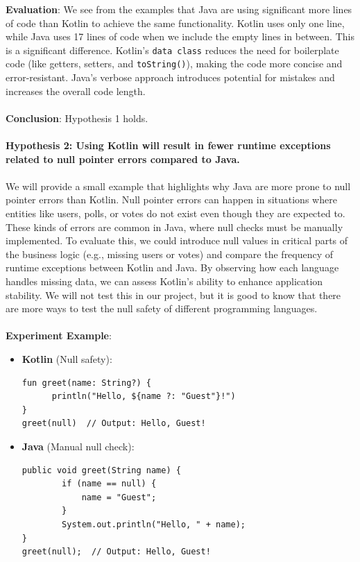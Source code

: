 \noindent \textbf{Evaluation}: We see from the examples that Java are using significant more lines of code than Kotlin to achieve the same functionality. Kotlin uses only one line, while Java uses 17 lines of code when we include the empty lines in between. This is a significant difference. Kotlin's \texttt{data class} reduces the need for boilerplate code (like getters, setters, and \texttt{toString()}), making the code more concise and error-resistant. Java’s verbose approach introduces potential for mistakes and increases the overall code length.
\\
\\
\textbf{Conclusion}: Hypothesis 1 holds. 
\\
\\
\textbf{Hypothesis 2: Using Kotlin will result in fewer runtime exceptions related to null pointer errors compared to Java.} 
\\
\\ 
We will provide a small example that highlights why Java are more prone to null pointer errors than Kotlin. Null pointer errors can happen in situations where entities like users, polls, or votes do not exist even though they are expected to. These kinds of errors are common in Java, where null checks must be manually implemented. To evaluate this, we could introduce null values in critical parts of the business logic (e.g., missing users or votes) and compare the frequency of runtime exceptions between Kotlin and Java. By observing how each language handles missing data, we can assess Kotlin’s ability to enhance application stability. We will not test this in our project, but it is good to know that there are more ways to test the null safety of different programming languages.
\\
\\
\textbf{Experiment Example}:
\begin{tcolorbox}[colframe=blue!80!black, colback=blue!5!white, coltitle=blue!50!black, title={-}]
    \begin{itemize}
	\vspace{0.5cm}
        \item \textbf{Kotlin} (Null safety):
        \begin{lstlisting}[style=kotlin]
fun greet(name: String?) {
      println("Hello, ${name ?: "Guest"}!")
}
greet(null)  // Output: Hello, Guest!
        \end{lstlisting}
        
        \item \textbf{Java} (Manual null check):
        \begin{lstlisting}[style=java]
public void greet(String name) {
        if (name == null) {
            name = "Guest";
        }
        System.out.println("Hello, " + name);
}
greet(null);  // Output: Hello, Guest!
        \end{lstlisting}
    \end{itemize}
\end{tcolorbox}


